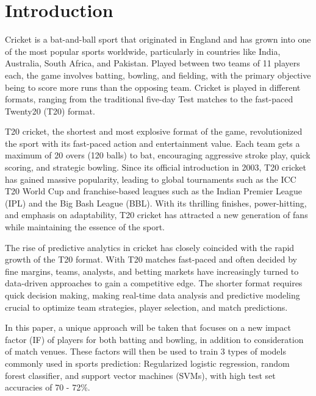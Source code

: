 \documentclass{article}[12pt]
\begin{document}
\section{Introduction}

Cricket is a bat-and-ball sport that originated in England and has grown into one of the most popular sports worldwide, particularly in countries like India, Australia, South Africa, and Pakistan. Played between two teams of 11 players each, the game involves batting, bowling, and fielding, with the primary objective being to score more runs than the opposing team. Cricket is played in different formats, ranging from the traditional five-day Test matches to the fast-paced Twenty20 (T20) format.

T20 cricket, the shortest and most explosive format of the game, revolutionized the sport with its fast-paced action and entertainment value. Each team gets a maximum of 20 overs (120 balls) to bat, encouraging aggressive stroke play, quick scoring, and strategic bowling. Since its official introduction in 2003, T20 cricket has gained massive popularity, leading to global tournaments such as the ICC T20 World Cup and franchise-based leagues such as the Indian Premier League (IPL) and the Big Bash League (BBL). With its thrilling finishes, power-hitting, and emphasis on adaptability, T20 cricket has attracted a new generation of fans while maintaining the essence of the sport.

The rise of predictive analytics in cricket has closely coincided with the rapid growth of the T20 format. With T20 matches fast-paced and often decided by fine margins, teams, analysts, and betting markets have increasingly turned to data-driven approaches to gain a competitive edge. The shorter format requires quick decision making, making real-time data analysis and predictive modeling crucial to optimize team strategies, player selection, and match predictions.

In this paper, a unique approach will be taken that focuses on a new impact factor (IF) of players for both batting and bowling, in addition to consideration of match venues. These factors will then be used to train 3 types of models commonly used in sports prediction: Regularized logistic regression, random forest classifier, and support vector machines (SVMs), with high test set accuracies of 70 - 72\%. \parencite{vistro_2019}
\end{document}
